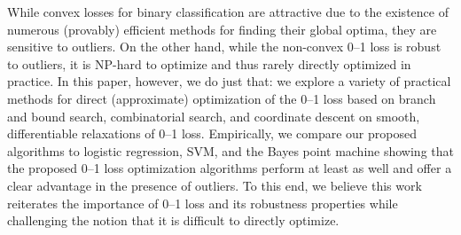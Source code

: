 While convex losses for binary classification are attractive due to
the existence of numerous (provably) efficient methods for finding
their global optima, they are sensitive to outliers.  On the other
hand, while the non-convex 0--1 loss is robust to outliers, it is
NP-hard to optimize and thus rarely directly optimized in practice.
In this paper, however, we do just that: we explore a variety of
practical methods for direct (approximate) optimization of the 0--1
loss based on branch and bound search, combinatorial search, and
coordinate descent on smooth, differentiable relaxations of 0--1 loss.
Empirically, we compare our proposed algorithms to logistic
regression, SVM, and the Bayes point machine showing that the proposed
0--1 loss optimization algorithms perform at least as well and offer a
clear advantage in the presence of outliers.  To this end, we believe
this work reiterates the importance of 0--1 loss and its robustness
properties while challenging the notion that it is difficult to
directly optimize.

